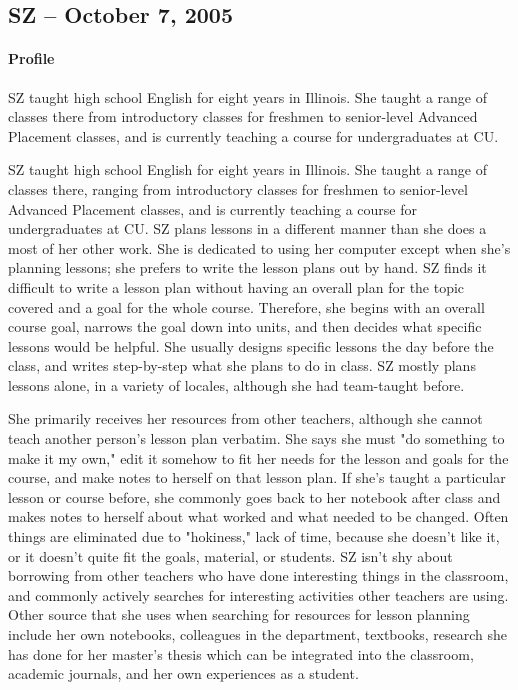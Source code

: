 \documentclass[12pt,titlepage]{article}
\begin{document}
\subsection{SZ -- October 7, 2005}
\paragraph{Profile} SZ taught high school English for eight years in Illinois.
She taught a range of classes there from introductory classes for freshmen to
senior-level Advanced Placement classes, and is currently teaching a course for
undergraduates at CU.

SZ taught high school English for eight years in Illinois.  She taught a range
of classes there, ranging from introductory classes for freshmen to senior-level
Advanced Placement classes, and is currently teaching a course for
undergraduates at CU.  SZ plans lessons in a different manner than she does a
most of her other work.  She is dedicated to using her computer except when
she's planning lessons; she prefers to write the lesson plans out by hand.  SZ
finds it difficult to write a lesson plan without having an overall plan for the
topic covered and a goal for the whole course.  Therefore, she begins with an
overall course goal, narrows the goal down into units, and then decides what
specific lessons would be helpful. She usually designs specific lessons the day
before the class, and writes step-by-step what she plans to do in class. SZ
mostly plans lessons alone, in a variety of locales, although she had
team-taught before.

She primarily receives her resources from other teachers, although she cannot
teach another person's lesson plan verbatim.  She says she must "do something to
make it my own," edit it somehow to fit her needs for the lesson and goals for
the course, and make notes to herself on that lesson plan.  If she's taught a
particular lesson or course before, she commonly goes back to her notebook after
class and makes notes to herself about what worked and what needed to be
changed.  Often things are eliminated due to "hokiness," lack of time, because
she doesn't like it, or it doesn't quite fit the goals, material, or students.
SZ isn't shy about borrowing from other teachers who have done interesting
things in the classroom, and commonly actively searches for interesting
activities other teachers are using.  Other source that she uses when searching
for resources for lesson planning include her own notebooks, colleagues in the
department, textbooks, research she has done for her master's thesis which can
be integrated into the classroom, academic journals, and her own experiences as
a student.
\end{document}
